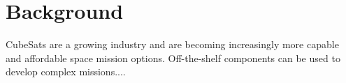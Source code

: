 \chapter{Background}\label{CH:background}
CubeSats are a growing industry and are becoming increasingly more capable and affordable space mission options. Off-the-shelf components can be used to develop complex missions....